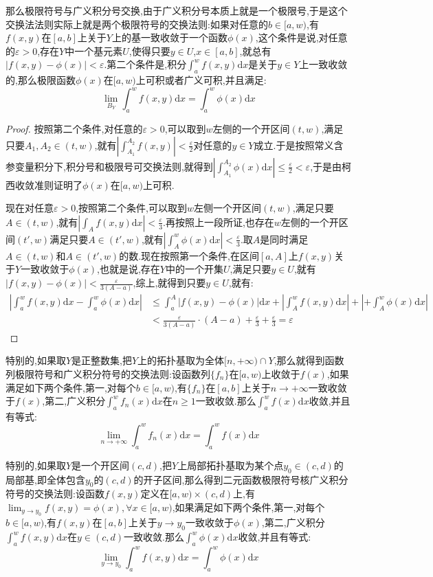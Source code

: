 那么极限符号与广义积分号交换,由于广义积分号本质上就是一个极限号,于是这个交换法法则实际上就是两个极限符号的交换法则:如果对任意的$b\in[a,w)$,有$f(x,y)$在$[a,b]$上关于$Y$上的基一致收敛于一个函数$\phi(x)$,这个条件是说,对任意的$\varepsilon>0$,存在$Y$中一个基元素$U$,使得只要$y\in U$,$x\in[a,b]$,就总有$|f(x,y)-\phi(x)|<\varepsilon$.第二个条件是,积分$\int_a^wf(x,y)\mathrm{d}x$是关于$y\in Y$上一致收敛的,那么极限函数$\phi(x)$在$[a,w)$上可积或者广义可积,并且满足:
$$\lim_{B_Y}\int_a^wf(x,y)\mathrm{d}x=\int_a^w\phi(x)\mathrm{d}x$$
\begin{proof}
	
	按照第二个条件,对任意的$\varepsilon>0$,可以取到$w$左侧的一个开区间$(t,w)$,满足只要$A_1,A_2\in(t,w)$,就有$\left|\int_{A_1}^{A_2}f(x,y)\right|<\frac{\varepsilon}{2}$对任意的$y\in Y$成立.于是按照常义含参变量积分下,积分号和极限号可交换法则,就得到$\left|\int_{A_1}^{A_2}\phi(x)\mathrm{d}x\right|\le\frac{\varepsilon}{2}<\varepsilon$,于是由柯西收敛准则证明了$\phi(x)$在$[a,w)$上可积.
	
	现在对任意$\varepsilon>0$,按照第二个条件,可以取到$w$左侧一个开区间$(t,w)$,满足只要$A\in(t,w)$,就有$\left|\int_Af(x,y)\mathrm{d}x\right|<\frac{\varepsilon}{3}$.再按照上一段所证,也存在$w$左侧的一个开区间$(t',w)$满足只要$A\in(t',w)$,就有$\left|\int_A^w\phi(x)\mathrm{d}x\right|<\frac{\varepsilon}{3}$.取$A$是同时满足$A\in(t,w)$和$A\in(t',w)$的数.现在按照第一个条件,在区间$[a,A]$上$f(x,y)$关于$Y$一致收敛于$\phi(x)$,也就是说,存在$Y$中的一个开集$U$,满足只要$y\in U$,就有$|f(x,y)-\phi(x)|<\frac{\varepsilon}{3(A-a)}$,综上,就得到只要$y\in U$,就有:
	\begin{align*}
	\left|\int_a^wf(x,y)\mathrm{d}x-\int_a^w\phi(x)\mathrm{d}x\right| &\le\int_a^A|f(x,y)-\phi(x)|\mathrm{d}x+\left|\int_A^wf(x,y)\mathrm{d}x\right|+\left|+\int_A^w\phi(x)\mathrm{d}x\right| \\
	&<\frac{\varepsilon}{3(A-a)}\cdot(A-a)+\frac{\varepsilon}{3}+\frac{\varepsilon}{3}=\varepsilon
	\end{align*}
\end{proof}

特别的,如果取$Y$是正整数集,把$Y$上的拓扑基取为全体$[n,+\infty)\cap Y$,那么就得到函数列极限符号和广义积分符号的交换法则:设函数列$\{f_n\}$在$[a,w)$上收敛于$f(x)$,如果满足如下两个条件,第一,对每个$b\in[a,w)$,有$\{f_n\}$在$[a,b]$上关于$n\to+\infty$一致收敛于$f(x)$,第二,广义积分$\int_a^wf_n(x)\mathrm{d}x$在$n\ge1$一致收敛.那么$\int_a^wf(x)\mathrm{d}x$收敛,并且有等式:
$$\lim_{n\to+\infty}\int_a^wf_n(x)\mathrm{d}x=\int_a^wf(x)\mathrm{d}x$$

特别的,如果取$Y$是一个开区间$(c,d)$,把$Y$上局部拓扑基取为某个点$y_0\in(c,d)$的局部基,即全体包含$y_0$的$(c,d)$的开子区间,那么得到二元函数极限符号核广义积分符号的交换法则:设函数$f(x,y)$定义在$[a,w)\times(c,d)$上,有$\lim_{y\to y_0}f(x,y)=\phi(x),\forall x\in[a,w)$,如果满足如下两个条件,第一,对每个$b\in[a,w)$,有$f(x,y)$在$[a,b]$上关于$y\to y_0$一致收敛于$\phi(x)$,第二,广义积分$\int_a^wf(x,y)\mathrm{d}x$在$y\in(c,d)$一致收敛.那么$\int_a^w\phi(x)\mathrm{d}x$收敛,并且有等式:
$$\lim_{y\to y_0}\int_a^wf(x,y)\mathrm{d}x=\int_a^w\phi(x)\mathrm{d}x$$

